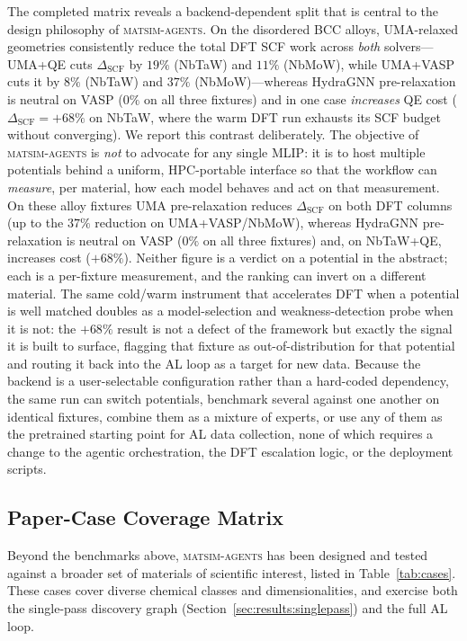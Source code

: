 \documentclass[conference]{IEEEtran}
\def\acs#1{#1}%
\begin{document}
The completed matrix reveals a backend-dependent split that is central to
the design philosophy of \textsc{matsim-agents}. On the disordered \acs{BCC}
alloys, UMA-relaxed geometries consistently reduce the total \acs{DFT} \acs{SCF}
work across \emph{both} solvers---UMA+\acs{QE} cuts $\Delta_\text{SCF}$ by
$19\%$ (NbTaW) and $11\%$ (NbMoW), while UMA+\acs{VASP} cuts it by
$8\%$ (NbTaW) and $37\%$ (NbMoW)---whereas HydraGNN pre-relaxation is
neutral on \acs{VASP} ($0\%$ on all three fixtures) and in one case
\emph{increases} \acs{QE} cost ($\Delta_\text{SCF}=+68\%$ on NbTaW, where the
warm \acs{DFT} run exhausts its \acs{SCF} budget without converging). We report
this contrast deliberately. The objective of \textsc{matsim-agents} is
\emph{not} to advocate for any single \acs{MLIP}: it is to host multiple
potentials behind a uniform, \acs{HPC}-portable interface so that the workflow
can \emph{measure}, per material, how each model behaves and act on that
measurement. On these alloy fixtures UMA pre-relaxation reduces
$\Delta_\text{SCF}$ on both \acs{DFT} columns (up to the $37\%$ reduction on
UMA+\acs{VASP}/NbMoW), whereas HydraGNN pre-relaxation is neutral on \acs{VASP}
($0\%$ on all three fixtures) and, on NbTaW+\acs{QE}, increases cost ($+68\%$).
Neither figure is a verdict on a potential in the abstract; each is a per-fixture
measurement, and the ranking can invert on a different material. The same
cold/warm instrument that accelerates \acs{DFT} when a potential is well matched
doubles as a model-selection and weakness-detection probe when it is not: the
$+68\%$ result is not a defect of the framework but exactly the signal it is
built to surface, flagging that fixture as out-of-distribution for that potential
and routing it back into the \acs{AL} loop as a target for new data.
Because the backend is a user-selectable configuration rather than a hard-coded
dependency, the same run can switch potentials, benchmark several against one
another on identical fixtures, combine them as a mixture of experts, or use any
of them as the pretrained starting point for \acs{AL} data
collection, none of which requires a change to the agentic orchestration, the
\acs{DFT} escalation logic, or the deployment scripts.

\subsection{Paper-Case Coverage Matrix}
Beyond the benchmarks above, \textsc{matsim-agents} has been designed and
tested against a broader set of materials of scientific interest, listed in
Table~\ref{tab:cases}. These cases cover diverse chemical classes and
dimensionalities, and exercise both the single-pass discovery graph
(Section~\ref{sec:results:singlepass}) and the full \acs{AL} loop.
\end{document}
